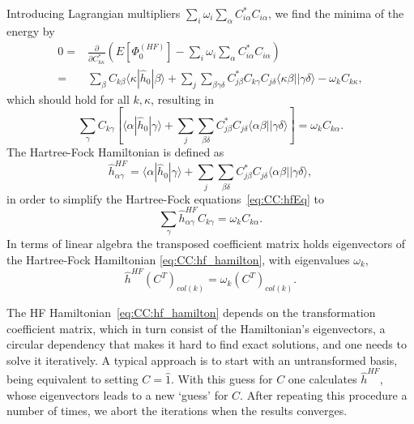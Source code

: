 Introducing Lagrangian multipliers $\sum_i \omega_i \sum_{\alpha} C_{i\alpha}^{*} C_{i\alpha}$, we find the minima of the energy by
\begin{equation}
\begin{split}
0 
=&
\frac{\partial}{\partial C^{*}_{k\kappa}} \left(E\left[\Phi_0^{(HF)}\right]  - \sum_i \omega_i \sum_{\alpha} C_{i\alpha}^{*} C_{i\alpha} \right) \\
=&
\sum_{ \beta} C_{k\beta} \langle \kappa | \hat{h}_0 | \beta \rangle 
+
 \sum_{j} \sum_{ \beta \gamma \delta}
C_{j\beta}^{*} C_{k\gamma} C_{j\delta} \langle \kappa \beta || \gamma \delta \rangle 
- 
\omega_k  C_{k\kappa} ,
\end{split}
\end{equation}
which should hold for all $k,\kappa$, resulting in 
\begin{equation}
\label{eq:CC:hfEq}
\sum_{ \gamma} C_{k\gamma} \left[ 
\langle \alpha | \hat{h}_0 | \gamma \rangle 
+
 \sum_{j} \sum_{ \beta \delta}
C_{j\beta}^{*} C_{j\delta} \langle \alpha \beta || \gamma \delta \rangle 
\right] 
=
\omega_k  C_{k\alpha}  .
\end{equation}
The Hartree-Fock Hamiltonian is defined as
\begin{equation}
\label{eq:CC:hf_hamilton}
\hat{h}_{\alpha\gamma}^{HF}
= 
\langle \alpha | \hat{h}_0 | \gamma \rangle 
+
 \sum_{j} \sum_{ \beta \delta}
C_{j\beta}^{*} C_{j\delta} \langle \alpha \beta || \gamma \delta \rangle ,
\end{equation}
in order to simplify the Hartree-Fock equations~\eqref{eq:CC:hfEq} to
\begin{equation}
\sum_{ \gamma} \hat{h}_{\alpha\gamma}^{HF} C_{k\gamma}
=
\omega_k  C_{k\alpha}  .
\end{equation}
In terms of linear algebra the transposed coefficient matrix holds eigenvectors of the Hartree-Fock Hamiltonian \eqref{eq:CC:hf_hamilton}, with eigenvalues $\omega_k$,
\begin{equation}
\hat{h}^{HF} (C^T)_{col(k)}
=
\omega_k  (C^T)_{col(k)} .
\end{equation}


The HF Hamiltonian~\eqref{eq:CC:hf_hamilton} depends on the transformation coefficient matrix, which in turn consist of the Hamiltonian's eigenvectors, a circular dependency that makes it hard to find exact solutions, and one needs to solve it iteratively.
A typical approach is to start with an untransformed basis, being equivalent to setting $C = \hat{1}$. 
With this guess for $C$ one calculates $\hat{h}^{HF}$, whose eigenvectors leads to a new `guess' for $C$. 
After repeating this procedure a number of times, we abort the iterations when the results converges.

